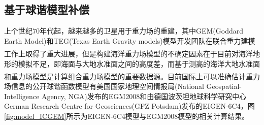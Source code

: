 \documentclass[12pt,a4,utf8]{article}
\newcommand{\upcite}[1]{\textsuperscript{\textsuperscript{\cite{#1}}}} %
\begin{document}
\subsection{基于球谐模型补偿}
上个世纪70年代起，越来越多的卫星用于重力场的重建，其中GEM(Goddard Earth Model)和TEG(Texas Earth Gravity models)模型开发团队在联合重力建模工作上取得了重大进展\upcite{lerch1972gravitational,tapley1997teg}，但是构建海洋重力场模型的不确定因素在于目前对海洋地形的模拟不足，即海面与大地水准面之间的高度差，而基于测高的海洋大地水准面和重力场模型是计算组合重力场模型的重要数据源\upcite{pavlis2012development,flechtner2021satellite}。目前国际上可以准确估计重力场信息的公开球谐函数模型有美国国家地理空间情报局(National Geospatial-Intelligence Agency, NGA)发布的EGM2008和由德国波茨坦地球科学研究中心German Research Centre for Geosciences(GFZ Potsdam)发布的EIGEN-6C4，图\ref{fig:model_ICGEM}所示为EIGEN-6C4模型与EGM2008模型的相关计算结果。
\end{document}
